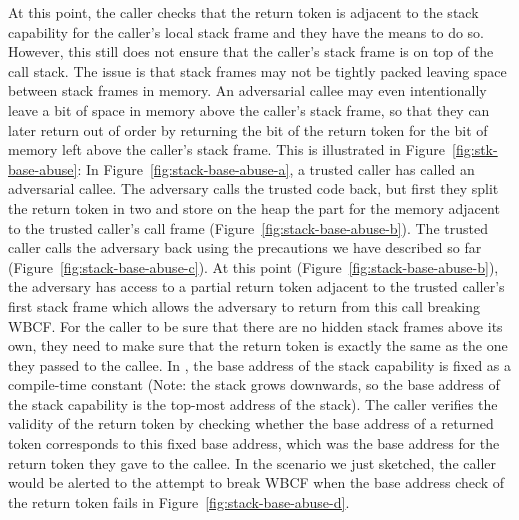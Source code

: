\documentclass[acmsmall,review,showframe]{acmart}\settopmatter{printfolios=true,printccs=false,printacmref=false}
\begin{document}
At this point, the caller checks that the return token is adjacent to the stack capability for the caller's local stack frame and they have the means to do so.
However, this still does not ensure that the caller's stack frame is on top of the call stack.
The issue is that stack frames may not be tightly packed leaving space between stack frames in memory.
An adversarial callee may even intentionally leave a bit of space in memory above the caller's stack frame, so that they can later return out of order by returning the bit of the return token for the bit of memory left above the caller's stack frame.
This is illustrated in Figure~\ref{fig:stk-base-abuse}: In Figure~\ref{fig:stack-base-abuse-a}, a trusted caller has called an adversarial callee.
The adversary calls the trusted code back, but first they split the return token in two and store on the heap the part for the memory adjacent to the trusted caller's call frame (Figure~\ref{fig:stack-base-abuse-b}).
The trusted caller calls the adversary back using the precautions we have described so far (Figure~\ref{fig:stack-base-abuse-c}).
At this point (Figure~\ref{fig:stack-base-abuse-b}), the adversary has access to a partial return token adjacent to the trusted caller's first stack frame which allows the adversary to return from this call breaking WBCF.
For the caller to be sure that there are no hidden stack frames above its own, they need to make sure that the return token is exactly the same as the one they passed to the callee.
In \stktokens{}, the base address of the stack capability is fixed as a compile-time constant (Note: the stack grows downwards, so the base address of the stack capability is the top-most address of the stack). 
The caller verifies the validity of the return token by checking whether the base address of a returned token corresponds to this fixed base address, which was the base address for the return token they gave to the callee.
In the scenario we just sketched, the caller would be alerted to the attempt to break WBCF when the base address check of the return token fails in Figure~\ref{fig:stack-base-abuse-d}.
\end{document}
